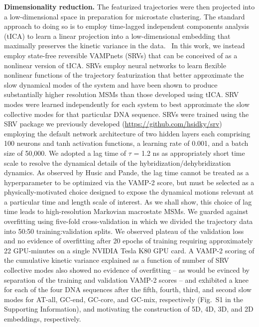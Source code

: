 \documentclass[journal=jpcbfk,manuscript=article]{achemso}
\newcommand*{\blauw}[1]{{#1}}
\begin{document}
\textbf{Dimensionality reduction.} The featurized trajectories were then projected into a low-dimensional space in preparation for microstate clustering. The standard approach to doing so is to employ time-lagged independent components analysis (tICA) to learn a linear projection into a low-dimensional embedding that maximally preserves the kinetic variance in the data.~\citep{Perez-Hernandez2013IdentificationConstruction, Schwantes2013ImprovementsNTL9, Noe2015KineticSimulation} In this work, we instead employ state-free reversible VAMPnets (SRVs) that can be conceived of as a nonlinear version of tICA. \citep{Chen} SRVs employ neural networks to learn flexible nonlinear functions of the trajectory featurization that better approximate the slow dynamical modes of the system and have been shown to produce substantially higher resolution MSMs than those developed using tICA.\citep{Chen, Sidky2019High-ResolutionVAMPnets} SRV modes were learned independently for each system to best approximate the slow collective modes for that particular DNA sequence. SRVs were trained using the SRV package we previously developed (\url{https://github.com/hsidky/srv}) employing the default network architecture of two hidden layers each comprising 100 neurons and tanh activation functions, a learning rate of 0.001, and a batch size of 50,000. We adopted a lag time of $\tau$ = 1.2 ns as appropriately short time scale to resolve the dynamical details of the hybridization/dehybridization dynamics. \citep{Phys2011MarkovValidation} As observed by Husic and Pande, the lag time cannot be treated as a hyperparameter to be optimized via the VAMP-2 score, but must be selected as a physically-motivated choice designed to expose the dynamical motions relevant at a particular time and length scale of interest. \citep{Husic2017Note:Selection} As we shall show, this choice of lag time leads to high-resolution Markovian macrostate MSMs. We guarded against overfitting using five-fold cross-validation in which we divided the trajectory data into 50:50 training:validation splits. We observed plateau of the validation loss and no evidence of overfitting after 20 epochs of training requiring approximately 22 GPU-minutes on a single NVIDIA Tesla K80 GPU card. A VAMP-2 scoring of the cumulative kinetic variance explained as a function of number of SRV collective modes also showed no evidence of overfitting -- as would be evinced by separation of the training and validation VAMP-2 scores \citep{Sidky2019High-ResolutionVAMPnets} -- and exhibited a knee for each of the four DNA sequences after the fifth, fourth, third, and second slow modes for AT-all, GC-end, GC-core, and GC-mix, respectively (\blauw{Fig.~S1} in the \blauw{Supporting Information}), and motivating the construction of 5D, 4D, 3D, and 2D embeddings, respectively.
\end{document}
